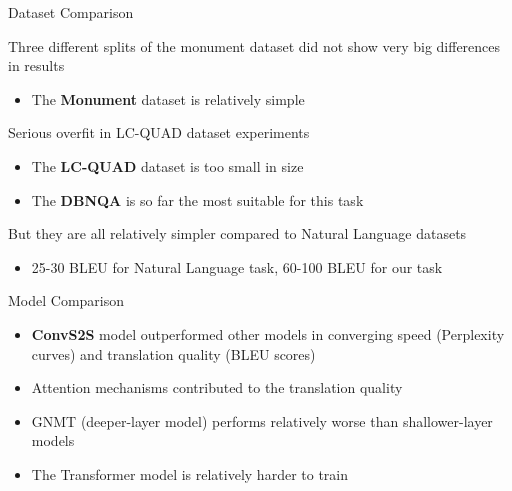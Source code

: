 \documentclass[11pt]{beamer}
\begin{document}
\begin{frame}{Dataset Comparison}

    \pause
    Three different splits of the monument dataset did not show very big differences in results
    \begin{itemize}
        \item The \textbf{Monument} dataset is relatively simple
    \end{itemize}

    \pause
    Serious overfit in LC-QUAD dataset experiments
    \begin{itemize}
        \item The \textbf{LC-QUAD} dataset is too small in size
    \end{itemize}

    \pause
    \begin{itemize}
        \item The \textbf{DBNQA} is so far the most suitable for this task
    \end{itemize}
    \medskip
    \pause
    But they are all relatively simpler compared to Natural Language datasets
    \begin{itemize}
        \item \alert{25-30 BLEU} for Natural Language task, \alert{60-100 BLEU} for our task
    \end{itemize}
\end{frame}

\begin{frame}{Model Comparison}

    \begin{itemize}
        \item<1> \textbf{ConvS2S} model outperformed other models in converging speed (Perplexity curves) and translation quality (BLEU scores)
        \item<2> Attention mechanisms contributed to the translation quality
        \item<3> GNMT (deeper-layer model) performs relatively worse than shallower-layer models
        \item<4> The Transformer model is relatively harder to train
    \end{itemize}

\end{frame}
\end{document}
